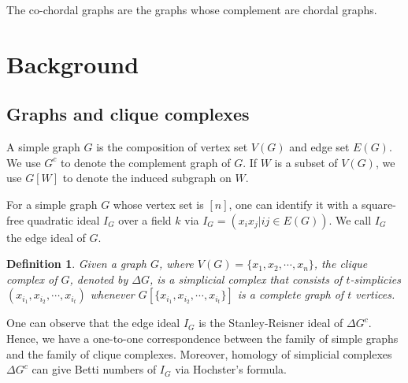 \documentclass[dvipsnames,10pt]{article}
\newtheorem{defi}[theorem]{Definition}
\begin{document}
The co-chordal graphs are the graphs whose complement are chordal graphs.



\section{Background}
\subsection{Graphs and clique complexes}
A simple graph $G$ is the composition of vertex set $V(G)$ and edge set $E(G)$. We use $G^c$ to denote the complement graph of $G$. If $W$ is a subset of $V(G)$, we use $G[W]$ to denote the induced subgraph on $W$.

For a simple graph $G$ whose vertex set is $[n]$, one can identify it with
a square-free quadratic ideal $I_G$ over a field $k$ via $I_G=(x_ix_j | ij\in E(G))$. We call $I_G$ the edge ideal of $G$.

\begin{defi}
    Given a graph $G$, where $V(G)=\{x_1,x_2,\cdots,x_n\}$, the clique complex of $G$, denoted by $\Delta G$, is a simplicial complex that consists of $t$-simplicies $(x_{i_1},x_{i_2},\cdots ,x_{i_t})$ whenever $G[\{x_{i_1},x_{i_2},\cdots ,x_{i_t}\}]$ is a complete graph of $t$ vertices.
\end{defi}

One can observe that the edge ideal $I_G$ is the Stanley-Reisner ideal of $\Delta G^c$. Hence, we have a one-to-one correspondence between the family of simple graphs and the family of clique complexes. Moreover, homology of simplicial complexes $\Delta G^c$ can give Betti numbers of $I_G$ via Hochster's formula.
\end{document}
